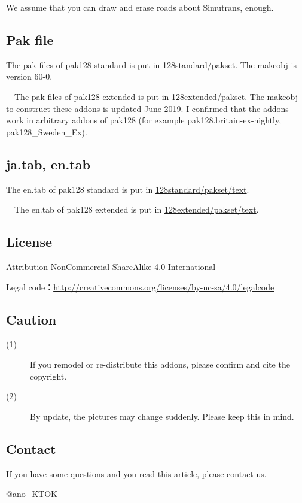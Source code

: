 \documentclass{jbook}
\begin{document}
We assume that you can draw and erase roads about Simutrans, enough.

\subsection*{Pak file}

The pak files of pak128 standard is put in \href{https://github.com/anoKTOK/Yokubari_roads_set_ver_anoKTOK/tree/main/128standard/pakset}{128standard/pakset}.
The makeobj is version 60-0.

　The pak files of pak128 extended is put in \href{https://github.com/anoKTOK/Yokubari_roads_set_ver_anoKTOK/tree/main/128extended/pakset}{128extended/pakset}.
 The makeobj to construct these addons is updated June 2019.
 I confirmed that the addons work in arbitrary addons of pak128 (for example pak128.britain-ex-nightly, pak128{\_}Sweden{\_}Ex).

\subsection*{ja.tab, en.tab}
 The en.tab of pak128 standard is put in \href{https://github.com/anoKTOK/Yokubari_roads_set_ver_anoKTOK/tree/main/128standard/pakset/text}{128standard/pakset/text}.

 　The en.tab of pak128 extended is put in \href{https://github.com/anoKTOK/Yokubari_roads_set_ver_anoKTOK/tree/main/128extended/pakset/text}{128extended/pakset/text}.


\subsection*{License}
Attribution-NonCommercial-ShareAlike 4.0 International

Legal code：\href{http://creativecommons.org/licenses/by-nc-sa/4.0/legalcode}{http://creativecommons.org/licenses/by-nc-sa/4.0/legalcode}


\subsection*{Caution}

\begin{description}
  \item[(1)]
    If you remodel or re-distribute this addons, please confirm and cite the copyright.
  \item[(2)]
    By update, the pictures may change suddenly. Please keep this in mind.
\end{description}

\subsection*{Contact}

If you have some questions and
you read this article,
please contact us.

\href{https://twitter.com/ano_KTOK_}{@ano\_KTOK\_}

\newpage
\end{document}

